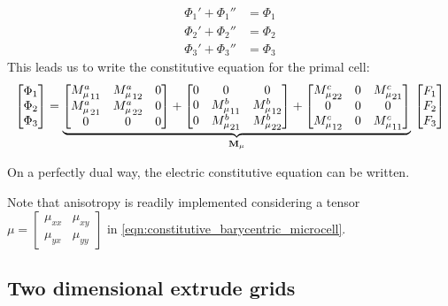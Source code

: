 \begin{align}
  \Phi_1' + \Phi_1'' & = \Phi_1 \\
  \Phi_2' + \Phi_2'' & = \Phi_2 \\
  \Phi_3' + \Phi_3'' & = \Phi_3
\end{align}
This leads us to write the constitutive equation for the primal cell:
\begin{equation} \label{eqn:constitutive_barycentric}
  \begin{bmatrix} \Phi_1 \\ \Phi_2 \\ \Phi_3 \end{bmatrix} = {
  \underbrace{
    \begin{bmatrix}
      {M_\mu^a}_{11} & {M_\mu^a}_{12} & 0 \\
      {M_\mu^a}_{21} & {M_\mu^a}_{22} & 0 \\
      0 & 0 & 0 \\
    \end{bmatrix} +
    \begin{bmatrix}
      0 & 0 & 0 \\
      0 & {M_\mu^b}_{11} & {M_\mu^b}_{12} \\
      0 & {M_\mu^b}_{21} & {M_\mu^b}_{22}
    \end{bmatrix} +
    \begin{bmatrix}
      {M_\mu^c}_{22} & 0 & {M_\mu^c}_{21} \\
      0 & 0 & 0 \\
      {M_\mu^c}_{12} & 0 & {M_\mu^c}_{11}
    \end{bmatrix}
    }_{\mathbf{M}_\mu}\,
  \begin{bmatrix} F_1 \\ F_2 \\ F_3 \end{bmatrix}}
\end{equation}

On a perfectly dual way, the electric constitutive equation can be
written.

Note that anisotropy is readily implemented considering a tensor $\mu
= \left[ \begin{smallmatrix} \mu_{xx} & \mu_{xy} \\ \mu_{yx} &
  \mu_{yy} \end{smallmatrix} \right]$ in
\eqref{eqn:constitutive_barycentric_microcell}.

\subsection{Two dimensional extrude grids}

